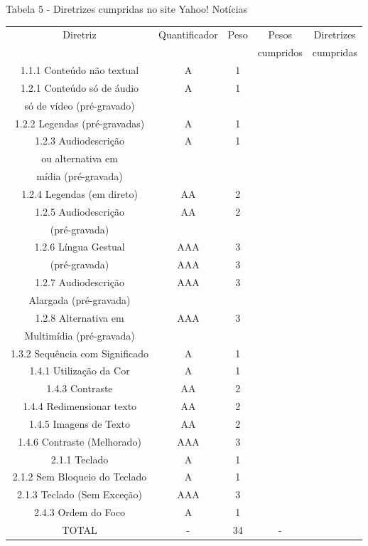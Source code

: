 \documentclass[a4paper]{article}
\begin{document}
\begin{titlepage}
Tabela 5 - Diretrizes cumpridas no site Yahoo! Notícias\\[-1cm]
\begin{center}
	\fontsize{8pt}{8pt}\selectfont	
	\begin{longtable}{|c|c|c|c|c|}
		\hline
		Diretriz & Quantificador & Peso & Pesos & Diretrizes\\
		& & & cumpridos & cumpridas\\
		\hline
		1.1.1 Conteúdo não textual & A & 1 & & \\
		\hline
		1.2.1 Conteúdo só de áudio & A & 1 & & \\
		só de vídeo (pré-gravado) & & & & \\
		\hline
		1.2.2 Legendas (pré-gravadas) & A & 1 & & \\
		\hline
		1.2.3 Audiodescrição & A & 1 & & \\
		ou alternativa em & & & & \\
		mídia (pré-gravada) & & & & \\
		\hline
		1.2.4 Legendas (em direto) & AA & 2 & & \\
		\hline
		1.2.5 Audiodescrição & AA & 2 & & \\
		(pré-gravada) & & & & \\
		\hline
		1.2.6 Língua Gestual & AAA & 3 & & \\
		(pré-gravada) & AAA & 3 & & \\
		\hline
		1.2.7 Audiodescrição & AAA & 3 & & \\
		Alargada (pré-gravada) & & & & \\
		\hline
		1.2.8 Alternativa em & AAA & 3 & & \\
		Multimídia (pré-gravada) & & & & \\
		\hline
		1.3.2 Sequência com Significado & A & 1 & & \\
		\hline
		1.4.1 Utilização da Cor & A & 1 & & \\
		\hline
		1.4.3 Contraste & AA & 2 & & \\
		\hline
		1.4.4 Redimensionar texto & AA & 2 & & \\
		\hline
		1.4.5 Imagens de Texto & AA & 2 & & \\
		\hline
		1.4.6 Contraste (Melhorado) & AAA & 3 & & \\
		\hline
		2.1.1 Teclado & A & 1 & & \\
		\hline
		2.1.2 Sem Bloqueio do Teclado & A & 1 & & \\
		\hline
		2.1.3 Teclado (Sem Exceção) & AAA & 3 & & \\
		\hline
		2.4.3 Ordem do Foco & A & 1 & & \\
		\hline
		TOTAL & - & 34 & - & \\
		\hline
	\end{longtable}
\end{center}


\end{titlepage}
\end{document}
